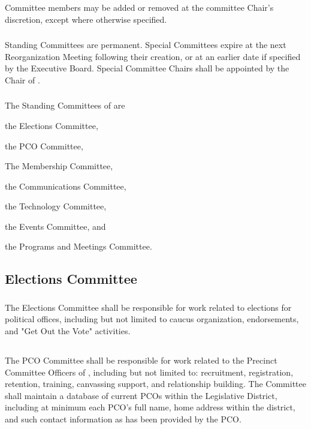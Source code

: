 \subsubsection{}
Committee members may be added or removed at the committee Chair's discretion, except where otherwise specified.

\subsubsection{}
Standing Committees are permanent. Special Committees expire at the next Reorganization Meeting following their creation, or at an earlier date if specified by the Executive Board. Special Committee Chairs shall be appointed by the Chair of \thedistrict{}.

\subsubsection{}
\label{standing-committee-list}
The Standing Committees of \thedistrict{} are
\begin{alphalist}
    \item the Elections Committee,
    \item the PCO Committee,
    \item The Membership Committee,
    \item the Communications Committee,
    \item the Technology Committee,
    \item the Events Committee, and
    \item the Programs and Meetings Committee.
\end{alphalist}

\subsection{Elections Committee}
\label{elections-committee}
\subsubsection{}
The Elections Committee shall be responsible for work related to elections for political offices, including but not limited to caucus organization, endorsements, and "Get Out the Vote" activities.

\subsection{} \label{pco-committee}
\subsubsection{}
The PCO Committee shall be responsible for work related to the Precinct Committee Officers of \thedistrict{}, including but not limited to: recruitment, registration, retention, training, canvassing support, and relationship building. The Committee shall maintain a database of current PCOs within the \fortythird{} Legislative District, including at minimum each PCO's full name, home address within the district, and such contact information as has been provided by the PCO.

